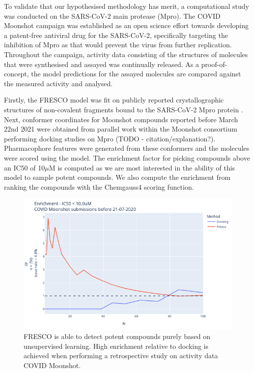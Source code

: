 \documentclass[journal=jacsat,manuscript=article]{achemso}
\newcommand{\uM}{$\mu$M }
\begin{document}
To validate that our hypothesised methodology has merit, a computational study was conducted on the SARS-CoV-2 main protease (Mpro). The COVID Moonshot campaign \cite{Moonshot2022} was established as an open science effort towards developing a patent-free antiviral drug for the SARS-CoV-2, specifically targeting the inhibition of Mpro as that would prevent the virus from further replication. Throughout the campaign, activity data consisting of the structures of molecules that were synthesised and assayed was continually released. As a proof-of-concept, the model predictions for the assayed molecules are compared against the measured activity and analysed.

Firstly, the FRESCO model was fit on publicly reported crystallographic structures of non-covalent fragments bound to the SARS-CoV-2 Mpro protein \cite{Douangamath2020XChem}. Next, conformer coordinates for Moonshot compounds reported before March 22nd 2021 were obtained from parallel work within the Moonshot consortium performing docking studies on Mpro (TODO - citation/explanation?). Pharmacophore features were generated from these conformers and the molecules were scored using the model. The enrichment factor for picking compounds above an IC50 of 10\uM is computed as we are most interested in the ability of this model to sample potent compounds. We also compute the enrichment from ranking the compounds with the Chemgauss4 scoring function.

\begin{figure}
    \centering
    \includegraphics[width=\textwidth]{figs/enrichment_vs_docking.png}
    \caption{FRESCO is able to detect potent compounds purely based on unsupervised learning. High enrichment relative to docking is achieved when performing a retrospective study on activity data COVID Moonshot.}
    \label{fig:moonshot_enrichment_vs_docking}
\end{figure}
\end{document}
